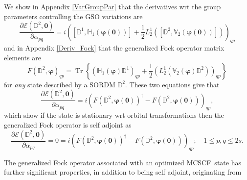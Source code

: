 \documentclass[aps,preprint]{revtex4}%
\begin{document}
We show in Appendix \ref{VarGroupPar} that the derivatives wrt the group
parameters controlling the GSO variations are
\begin{equation}
\frac{\partial\mathcal{E}\left(  \mathbb{D}^{2},\bm{0}\right)  }%
{\partial\alpha_{pq}}=i\left(  \left[  \mathbb{D}^{1},\mathbb{H}_{1}\left(
\bm{\varphi}\left(  \bm{0}\right)  \right)  \right]  +\frac{1}{2}L_{2}%
^{1}\left(  \left[  \mathbb{D}^{2},\mathbb{V}_{2}\left(  \bm{\varphi }\left(
\bm{0}\right)  \right)  \right]  \right)  \right)  _{qp}%
\end{equation}
and in Appendix \ref{Deriv_Fock} that the generalized Fock operator matrix
elements are
\begin{equation}
F\left(  \mathbb{D}^{2},\bm{\varphi}\right)  _{qp}=\operatorname{Tr}\left\{
\left(  \mathbb{H}_{1}\left(  \bm{\varphi}\right)  \mathbb{D}^{1}\right)
_{qp}+\frac{1}{2}\left(  L_{2}^{1}\left(  \mathbb{V}_{2}\left(
\bm{\varphi}\right)  \mathbb{D}^{2}\right)  \right)  _{qp}\right\}
\end{equation}
for \emph{any} state described by a SORDM $\mathbb{D}^{2}$. These two
equations give that
\begin{equation}
\frac{\partial\mathcal{E}\left(  \mathbb{D}^{2},\bm{0}\right)  }%
{\partial\alpha_{pq}}=i\left(  F\left(  \mathbb{D}^{2},\bm{\varphi}\left(
\bm{0}\right)  \right)  ^{\dagger}-F\left(  \mathbb{D}^{2}%
,\bm{\varphi }\left(  \bm{0}\right)  \right)  \right)  _{qp},
\end{equation}
which show if the state is stationary wrt orbital transformations then the
generalized Fock operator is self adjoint as
\begin{equation}
\frac{\partial\mathcal{E}\left(  \mathbb{D}^{2},\bm{0}\right)  }%
{\partial\alpha_{pq}}=0=i\left(  F\left(  \mathbb{D}^{2},\bm{\varphi }\left(
\bm{0}\right)  \right)  ^{\dagger}-F\left(  \mathbb{D}^{2},\bm{\varphi}\left(
\bm{0}\right)  \right)  \right)  _{qp};\quad1\leq p,q\leq2s.
\end{equation}


The generalized Fock operator associated with an optimized MCSCF\ state has
further significant properties, in addition to being self adjoint, originating from
\end{document}
